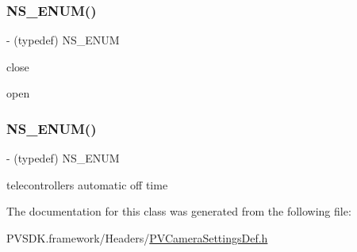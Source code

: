 \subsubsection{\texorpdfstring{N\+S\+\_\+\+E\+N\+U\+M()}{NS\_ENUM()}\hspace{0.1cm}{\footnotesize\ttfamily [16/17]}}
{\footnotesize\ttfamily -\/ (typedef) N\+S\+\_\+\+E\+N\+UM \begin{DoxyParamCaption}\item[{(N\+S\+U\+Integer)}]{ }\item[{(P\+V\+Eye\+O\+S\+D\+Switch\+State)}]{ }\end{DoxyParamCaption}}

close

open\mbox{\label{interface_p_v_camera_settings_def_a264ef8f1c784aacd7a1b25c5bf8ec369}} 
\subsubsection{\texorpdfstring{N\+S\+\_\+\+E\+N\+U\+M()}{NS\_ENUM()}\hspace{0.1cm}{\footnotesize\ttfamily [17/17]}}
{\footnotesize\ttfamily -\/ (typedef) N\+S\+\_\+\+E\+N\+UM \begin{DoxyParamCaption}\item[{(N\+S\+U\+Integer)}]{ }\item[{(P\+V\+Camera\+Auto\+Off\+Time)}]{ }\end{DoxyParamCaption}}

telecontroller\textquotesingle{}s automatic off time 

The documentation for this class was generated from the following file\+:\begin{DoxyCompactItemize}
\item 
P\+V\+S\+D\+K.\+framework/\+Headers/\hyperlink{_p_v_camera_settings_def_8h}{P\+V\+Camera\+Settings\+Def.\+h}\end{DoxyCompactItemize}

